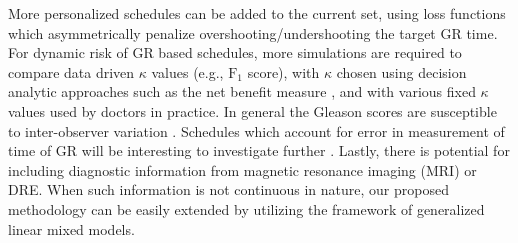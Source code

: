 More personalized schedules can be added to the current set, using loss functions which asymmetrically penalize overshooting/undershooting the target GR time. For dynamic risk of GR based schedules, more simulations are required to compare data driven $\kappa$ values (e.g., $\mbox{F}_1$ score), with $\kappa$ chosen using decision analytic approaches such as the net benefit measure \citep{vickers2006decision}, and with various fixed $\kappa$ values used by doctors in practice. In general the Gleason scores are susceptible to inter-observer variation \citep{Gleason_interobs_var}. Schedules which account for error in measurement of time of GR will be interesting to investigate further \citep{coley2017}. Lastly, there is potential for including diagnostic information from magnetic resonance imaging (MRI) or DRE. When such information is not continuous in nature, our proposed methodology can be easily extended by utilizing the framework of generalized linear mixed models.